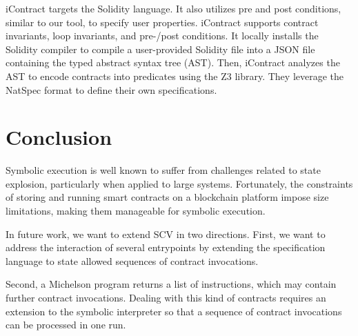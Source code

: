 \documentclass[a4paper,USenglish,cleveref, autoref, thm-restate]{lipics-v2021}
\begin{document}
iContract targets the Solidity language. It also utilizes pre and post conditions, similar to our tool, to specify user properties. iContract supports contract invariants, loop invariants, and pre-/post conditions. It locally installs the Solidity compiler to compile a user-provided Solidity file into a JSON file containing the typed abstract syntax tree (AST). Then, iContract analyzes the AST to encode contracts into predicates using the Z3 library. They leverage the NatSpec format to define their own specifications.

\section{Conclusion}
\label{sec:concl-sect-append}
Symbolic execution is well known to suffer from challenges related to
state explosion, particularly when applied to large
systems. Fortunately, the constraints of storing and running smart
contracts on a blockchain platform impose size limitations, making
them manageable for symbolic execution. 

In future work, we want to extend SCV in two directions. 
First, we want to address the interaction of several entrypoints by
extending the specification language to state allowed sequences of
contract invocations. 

Second, a Michelson program returns a list of instructions, which may contain
further contract invocations. Dealing with this kind of contracts
requires an extension to the symbolic interpreter so that a sequence
of contract invocations can be processed in one run.





\end{document}
